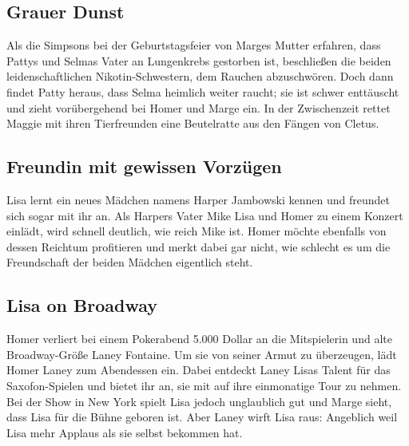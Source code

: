 \subsection{Grauer Dunst}\label{TABF19}
Als die Simpsons bei der Geburtstagsfeier von Marges Mutter erfahren, dass Pattys und Selmas Vater an Lungenkrebs gestorben ist, beschließen die beiden leidenschaftlichen Nikotin-Schwestern, dem Rauchen abzuschwören. Doch dann findet Patty heraus, dass Selma heimlich weiter raucht; sie ist schwer enttäuscht und zieht vorübergehend bei Homer und Marge ein. In der Zwischenzeit rettet Maggie mit ihren Tierfreunden eine Beutelratte aus den Fängen von Cletus.


\subsection{Freundin mit gewissen Vorzügen}
Lisa lernt ein neues Mädchen namens Harper Jambowski kennen und freundet sich sogar mit ihr an. Als Harpers Vater Mike Lisa und Homer zu einem Konzert einlädt, wird schnell deutlich, wie reich Mike ist. Homer möchte ebenfalls von dessen Reichtum profitieren und merkt dabei gar nicht, wie schlecht es um die Freundschaft der beiden Mädchen eigentlich steht.


\subsection{Lisa on Broadway}
Homer verliert bei einem Pokerabend 5.000 Dollar an die Mitspielerin und alte Broadway-Größe Laney Fontaine. Um sie von seiner Armut zu überzeugen, lädt Homer Laney zum Abendessen ein. Dabei entdeckt Laney Lisas Talent für das Saxofon-Spielen und bietet ihr an, sie mit auf ihre einmonatige Tour zu nehmen. Bei der Show in New York spielt Lisa jedoch unglaublich gut und Marge sieht, dass Lisa für die Bühne geboren ist. Aber Laney wirft Lisa raus: Angeblich weil Lisa mehr Applaus als sie selbst bekommen hat.

